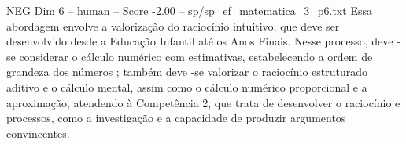 \begin{textsample}{NEG Dim 6 – human – Score -2.00 – sp/sp\_ef\_matematica\_3\_p6.txt}  \label{ex:f6_neg_015}
Essa abordagem envolve a valorização do raciocínio intuitivo, que deve ser desenvolvido desde a Educação Infantil até os Anos Finais.
Nesse processo, deve -se considerar o cálculo numérico com estimativas, estabelecendo a ordem de grandeza dos números ; também deve -se valorizar o raciocínio estruturado aditivo e o cálculo mental, assim como o cálculo numérico proporcional e a aproximação, atendendo à Competência 2, que trata de desenvolver o raciocínio e processos, como a investigação e a capacidade de produzir argumentos convincentes.

\end{textsample}
